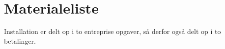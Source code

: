 \section{Materialeliste}

Installation er delt op i to entreprise opgaver, så derfor også delt op i to betalinger.

    
    
    

